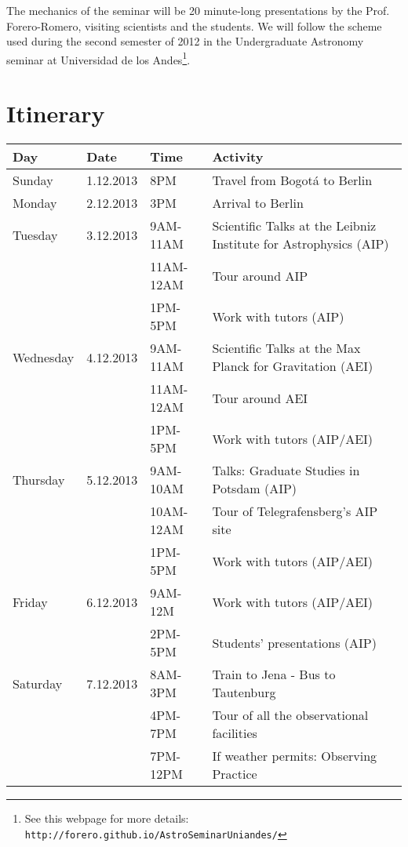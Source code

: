 \documentclass[12pt]{article}
\begin{document}
The mechanics of the seminar will be 20 minute-long presentations by the
Prof. Forero-Romero, visiting scientists and the students. We will follow the
scheme used during the second semester of 2012 in the Undergraduate
Astronomy seminar at Universidad de los Andes\footnote{See this
  webpage for more details:
  \verb"http://forero.github.io/AstroSeminarUniandes/"}. 




\section{Itinerary}

\begin{tabular}{p{2cm}p{2cm}p{2.5cm}p{7.0cm}}
Day & Date & Time & Activity\\\hline\hline

Sunday & 1.12.2013 & 8PM&	Travel from Bogot\'a to Berlin\\\hline

Monday &2.12.2013& 3PM & Arrival to Berlin\\\hline

Tuesday &3.12.2013& 9AM-11AM & Scientific Talks at the Leibniz Institute for Astrophysics (AIP)\\
 & & 11AM-12AM &Tour around AIP\\
 & & 1PM-5PM & Work with tutors (AIP)\\\hline

Wednesday &4.12.2013& 9AM-11AM &Scientific Talks at the Max Planck
for Gravitation (AEI)\\
 & & 11AM-12AM &Tour around AEI\\
 & & 1PM-5PM & Work with tutors (AIP/AEI)\\\hline

Thursday &5.12.2013 &  9AM-10AM & Talks: Graduate Studies in Potsdam (AIP)\\
& &  10AM-12AM & Tour of Telegrafensberg's AIP site\\
& & 1PM-5PM& Work with tutors (AIP/AEI)\\ \hline

Friday &6.12.2013& 9AM-12M & Work with tutors (AIP/AEI) \\		
      & & 2PM-5PM&  Students' presentations (AIP)\\\hline

Saturday & 7.12.2013& 8AM-3PM&	Train to Jena - Bus to Tautenburg\\
 & &4PM-7PM & Tour of all the observational facilities\\
 & &7PM-12PM & If weather permits: Observing Practice\\\hline


\end{tabular}
\end{document}
